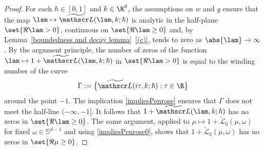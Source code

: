 \begin{proof}
For each $\hbar\in[0,1]$ and $k\in\R^d$, the assumptions on $w$ and $g$ ensure that the map $\lam\mapsto \widetilde {\mathscr L}(\lam,k;\hbar)$ is analytic in the half-plane $\set{\Re\lam>0}$, continuous on $\set{\Re\lam\geq0}$ and, by Lemma~\ref{boundedness and decay lemma}~\eqref{(c)}, tends to zero as $\abs{\lam}\to\infty$. By the argument principle, the number of zeros of the function $\lam\mapsto 1+\widetilde {\mathscr L}(\lam,k;\hbar)$ in $\set{\Re\lam>0}$ is equal to the winding number of the curve\vspace*{-3pt}
\begin{align*}
\Gamma:=\bigl\{\widetilde {\mathscr L}(i\tau,k;\hbar):\tau\in \R\bigr\}
\end{align*}
around the point $-1$. The implication \eqref{impliesPenrose} ensures that $\Gamma$ does not meet the half-line $(-\infty,-1]$. It follows that $1+\widetilde {\mathscr L}(\lam,k;\hbar)$ has no zeros in $\set{\Re\lam\geq0}$. The same argument, applied to $\mu\mapsto1+\widetilde{\mathscr L}_0(\mu,\omega)$ for fixed $\omega\in\mathbb S^{d-1}$ and using \eqref{impliesPenrose0}, shows that $1+\widetilde{\mathscr L}_0(\mu,\omega)$ has no zeros in $\set{\Re\mu\geq0}$.


\end{proof}

